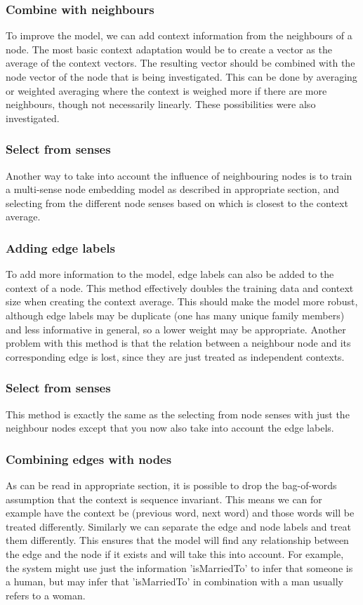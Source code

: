 \documentclass{article}
\begin{document}
  \subsubsection{Combine with neighbours}
  To improve the model, we can add context information from the neighbours of a node. The most basic context adaptation would be to create a vector as the average of the context vectors. The resulting vector should be combined with the node vector of the node that is being investigated. This can be done by averaging or weighted averaging where the context is weighed more if there are more neighbours, though not necessarily linearly. These possibilities were also investigated.
  \subsubsection{Select from senses}
  Another way to take into account the influence of neighbouring nodes is to train a multi-sense node embedding model as described in {appropriate section}, and selecting from the different node senses based on which is closest to the context average.
  \subsubsection{Adding edge labels}
  To add more information to the model, edge labels can also be added to the context of a node. This method effectively doubles the training data and context size when creating the context average. This should make the model more robust, although edge labels may be duplicate (one has many unique family members) and less informative in general, so a lower weight may be appropriate. Another problem with this method is that the relation between a neighbour node and its corresponding edge is lost, since they are just treated as independent contexts.
  \subsubsection{Select from senses}
  This method is exactly the same as the selecting from node senses with just the neighbour nodes except that you now also take into account the edge labels.
  \subsubsection{Combining edges with nodes}
  As can be read in {appropriate section}, it is possible to drop the bag-of-words assumption that the context is sequence invariant. 
  This means we can for example have the context be (previous word, next word) and those words will be treated differently. Similarly we can separate the edge and node labels and treat them differently. This ensures that the model will find any relationship between the edge and the node if it exists and will take this into account. For example, the system might use just the information 'isMarriedTo' to infer that someone is a human, but may infer that 'isMarriedTo' in combination with a man usually refers to a woman.
\end{document}
